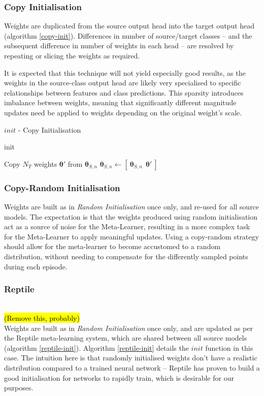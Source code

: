 \documentclass{report}
\newcommand{\TODO}[1]{\sethlcolor{pink}\hl{\\(#1)\\}}
\begin{document}
\subsubsection{Copy Initialisation}
Weights are duplicated from the source output head into the target output head (algorithm \ref{copy-init}). Differences in number of source/target classes -- and the subsequent difference in number of weights in each head -- are resolved by repeating or slicing the weights as required. \par
It is expected that this technique will not yield especially good results, as the weights in the source-class output head are likely very specialised to specific relationships between features and class predictions. This sparsity introduces imbalance between weights, meaning that significantly different magnitude updates need be applied to weights depending on the original weight's scale.
\begin{algorithm}[h!]
	\caption{$init$ - Copy Initialisation }init
	\label{copy-init}
	\begin{algorithmic}[1]
		\State Copy $N_T$ weights $\bm{\theta}'$ from $\bm{\theta}_{S,n}$
		\State $\bm{\theta}_{S,n} \gets [~ \bm{\theta}_{S,n}~ ~ \bm{\theta}'~ ]$
	\end{algorithmic}
\end{algorithm}

\subsubsection{Copy-Random Initialisation}
Weights are built as in \textit{Random Initialisation} once only, and re-used for all source models. The expectation is that the weights produced using random initialisation act as a source of noise for the Meta-Learner, resulting in a more complex task for the Meta-Learner to apply meaningful updates. Using a copy-random strategy should allow for the meta-learner to become accustomed to a random distribution, without needing to compensate for the differently sampled points during each episode.

\subsubsection{Reptile}
\TODO{Remove this, probably}
Weights are built as in \textit{Random Initialisation} once only, and are updated as per the Reptile\parencite{reptile} meta-learning system, which are shared between all source models (algorithm \ref{reptile-init}). Algorithm \ref{reptile-init} details the $init$ function in this case. The intuition here is that randomly initialised weights don't have a realistic distribution compared to a trained neural network -- Reptile has proven to build a good initialisation for networks to rapidly train, which is desirable for our purposes.
\end{document}
